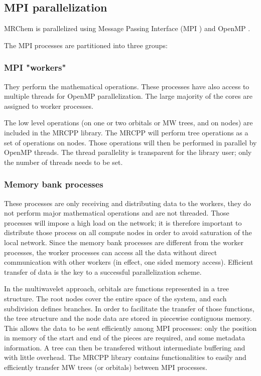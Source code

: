 \documentclass[%
 aip,
 amsmath,amssymb,
 reprint,%
]{revtex4-1}
\begin{document}
\subsection{MPI parallelization}

MRChem is parallelized using Message Passing Interface (MPI \cite{mpi}) and OpenMP \cite{omp}.  

The MPI processes are partitioned into three groups:

\subsubsection{MPI "workers"} 
They perform the mathematical operations. These processes have also access to multiple threads for OpenMP parallelization. The large majority of the cores are assigned to worker processes.

The low level operations (on one or two orbitals or MW trees, and on nodes) are included  in the MRCPP library. The MRCPP will perform tree operations as a set of operations on nodes. Those operations will then be performed in parallel by OpenMP threads. The thread parallelity is transparent for the library user; only the number of threads needs to be set.


\subsubsection{Memory bank processes} 
These processes are only receiving and distributing data to the workers, they do not perform major mathematical operations and are not threaded. Those processes will impose a high load on the network; it is therefore important to distribute those process on all compute nodes in order to avoid saturation of the local network. Since the memory bank processes are different from the worker processes, the worker processes can access all the data without direct communication with other workers (in effect, one sided memory access). Efficient transfer of data is the key to a successful parallelization scheme.

In the multiwavelet approach, orbitals are functions represented in a tree structure. The root nodes cover the entire space of the system, and each subdivision defines branches. In order to facilitate the transfer of those functions, the tree structure and the node data are stored in piecewise contiguous memory. This allows the data to be sent efficiently among MPI processes: only the position in memory of the start and end of the pieces are required, and some metadata information. A tree can then be transfered without intermediate buffering and with little overhead. 
The MRCPP library contains functionalities to easily and efficiently transfer MW trees (or orbitals) between MPI processes. 
\end{document}
